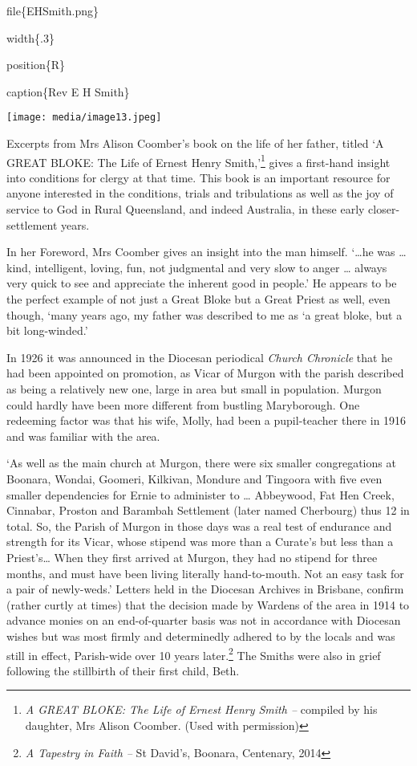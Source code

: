 file\{EHSmith.png\}

width\{.3\}

position\{R\}

caption\{Rev E H Smith\}

\texttt{[image: media/image13.jpeg]}

Excerpts from Mrs Alison Coomber's book on the life of her father,
titled `A GREAT BLOKE: The Life of Ernest Henry Smith,'\footnote{\emph{A
  GREAT BLOKE: The Life of Ernest Henry Smith --} compiled by his
  daughter, Mrs Alison Coomber. (Used with permission)} gives a
first-hand insight into conditions for clergy at that time. This book is
an important resource for anyone interested in the conditions, trials
and tribulations as well as the joy of service to God in Rural
Queensland, and indeed Australia, in these early closer-settlement
years.

In her Foreword, Mrs Coomber gives an insight into the man himself.
`\ldots he was \ldots{} kind, intelligent, loving, fun, not judgmental
and very slow to anger \ldots{} always very quick to see and appreciate
the inherent good in people.' He appears to be the perfect example of
not just a Great Bloke but a Great Priest as well, even though, `many
years ago, my father was described to me as `a great bloke, but a bit
long-winded.'

In 1926 it was announced in the Diocesan periodical \emph{Church
Chronicle} that he had been appointed on promotion, as Vicar of Murgon
with the parish described as being a relatively new one, large in area
but small in population. Murgon could hardly have been more different
from bustling Maryborough. One redeeming factor was that his wife,
Molly, had been a pupil-teacher there in 1916 and was familiar with the
area.

`As well as the main church at Murgon, there were six smaller
congregations at Boonara, Wondai, Goomeri, Kilkivan, Mondure and
Tingoora with five even smaller dependencies for Ernie to administer to
\ldots{} Abbeywood, Fat Hen Creek, Cinnabar, Proston and Barambah
Settlement (later named Cherbourg) thus 12 in total. So, the Parish of
Murgon in those days was a real test of endurance and strength for its
Vicar, whose stipend was more than a Curate's but less than a
Priest's\ldots{} When they first arrived at Murgon, they had no stipend
for three months, and must have been living literally hand-to-mouth. Not
an easy task for a pair of newly-weds.' Letters held in the Diocesan
Archives in Brisbane, confirm (rather curtly at times) that the decision
made by Wardens of the area in 1914 to advance monies on an
end-of-quarter basis was not in accordance with Diocesan wishes but was
most firmly and determinedly adhered to by the locals and was still in
effect, Parish-wide over 10 years later.\footnote{\emph{A Tapestry in
  Faith --} St David's, Boonara, Centenary, 2014} The Smiths were also
in grief following the stillbirth of their first child, Beth.


